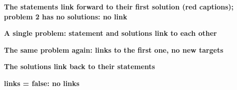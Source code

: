 \documentclass{article}
\newcommand\case[1]{\par\medskip\noindent\textbf{#1}\par\nopagebreak}
\begin{document}
\case{The statements link forward to their first solution (red captions); problem 2 has no solutions: no link}

\case{A single problem: statement and solutions link to each other}

\case{The same problem again: links to the first one, no new targets}

\newpage
\case{The solutions link back to their statements}

\case{links = false: no links}
\end{document}
